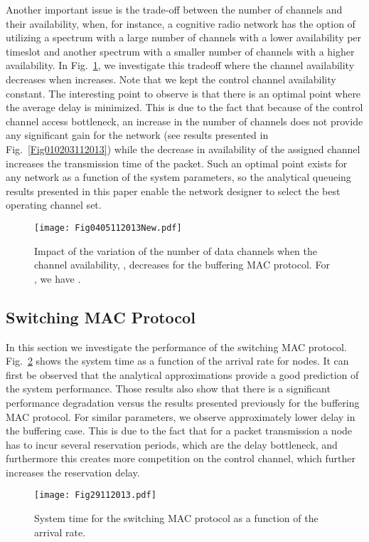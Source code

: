 \documentclass[12pt,journal,oneside,onecolumn]{IEEEtran}
\begin{document}
Another important issue is the trade-off between the 
number of channels and their availability, when, for instance, 
a cognitive radio network has the option of utilizing a spectrum with a large number of 
channels with a lower availability per timeslot and another spectrum with a 
smaller number of channels with a higher availability.  In Fig.~\ref{Fig0405112013}, we investigate
this tradeoff where the channel availability  decreases when  increases.  Note that 
we kept the control channel availability constant.
The interesting point to observe is that there is
an optimal point where the average delay is minimized. 
This is due to the fact that because of the control channel access bottleneck, an 
increase in the number of channels does not provide 
any significant gain for the network (see results presented in Fig.~\ref{Fig010203112013}) 
while the decrease in 
availability of the assigned channel increases the transmission time of the packet. 
Such an optimal point exists for any network as a 
function of the system parameters, 
so the analytical queueing results presented in this paper enable the network designer to select the best operating channel set.
\begin{figure}\texttt{[image: Fig0405112013New.pdf]}\caption{Impact of the variation of the number of data channels  when the channel availability, , decreases for the buffering MAC protocol. For , we have .}\label{Fig0405112013}\end{figure}







\subsection{Switching MAC Protocol}
\label{sec:sim-switch}

In this section we investigate the performance of the switching MAC protocol. 
Fig.~\ref{Fig29112013} shows the system time as a function of the arrival rate for  nodes.
It can first be observed that the analytical approximations provide a good prediction of the 
system performance.
Those results also show that there is a significant performance degradation versus
the results presented previously for the buffering MAC protocol. For similar parameters, we observe approximately  lower delay in the buffering case. 
This is due to the fact that for a packet transmission a node has to incur several reservation periods, which
are the delay bottleneck, and furthermore this creates more competition on the control channel, which further
increases the reservation delay.
\begin{figure}\texttt{[image: Fig29112013.pdf]}\caption{System time for the switching MAC protocol as a function of the arrival rate.}\label{Fig29112013}\end{figure}
\end{document}

